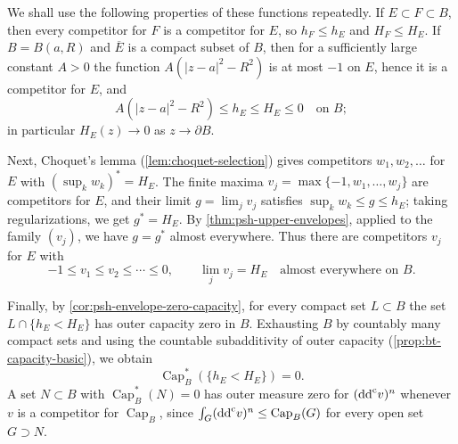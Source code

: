 We shall use the following properties of these functions repeatedly. If $E\subset F\subset B$, then every competitor for $F$ is a competitor for $E$, so $h_F\le h_E$ and $H_F\le H_E$. If $B=B(a,R)$ and $\overline E$ is a compact subset of $B$, then for a sufficiently large constant $A>0$ the function $A(|z-a|^2-R^2)$ is at most $-1$ on $E$, hence it is a competitor for $E$, and
\begin{equation}\label{eq:relative-extremal-barrier}
 A(|z-a|^2-R^2)\le h_E\le H_E\le0\quad\text{on }B;
\end{equation}
in particular $H_E(z)\to0$ as $z\to\partial B$.

Next, Choquet's lemma (\cref{lem:choquet-selection}) gives competitors $w_1,w_2,\ldots$ for $E$ with $(\sup_kw_k)^*=H_E$. The finite maxima $v_j=\max\{-1,w_1,\ldots,w_j\}$ are competitors for $E$, and their limit $g=\lim_jv_j$ satisfies $\sup_kw_k\le g\le h_E$; taking regularizations, we get $g^*=H_E$. By \cref{thm:psh-upper-envelopes}, applied to the family $(v_j)$, we have $g=g^*$ almost everywhere. Thus there are competitors $v_j$ for $E$ with
\begin{equation}\label{eq:relative-extremal-choquet}
 -1\le v_1\le v_2\le\cdots\le0,\qquad \lim_jv_j=H_E\quad\text{almost everywhere on }B.
\end{equation}

Finally, by \cref{cor:psh-envelope-zero-capacity}, for every compact set $L\subset B$ the set $L\cap\{h_E<H_E\}$ has outer capacity zero in $B$. Exhausting $B$ by countably many compact sets and using the countable subadditivity of outer capacity (\cref{prop:bt-capacity-basic}), we obtain
\begin{equation}\label{eq:relative-extremal-discrepancy}
 \operatorname{Cap}_B^*(\{h_E<H_E\})=0.
\end{equation}
A set $N\subset B$ with $\operatorname{Cap}_B^*(N)=0$ has outer measure zero for $(\mathrm{dd}^{\mathrm{c}} v)^n$ whenever $v$ is a competitor for $\operatorname{Cap}_B$, since $\int_G(\mathrm{dd}^{\mathrm{c}} v)^n\le\operatorname{Cap}_B(G)$ for every open set $G\supset N$.

